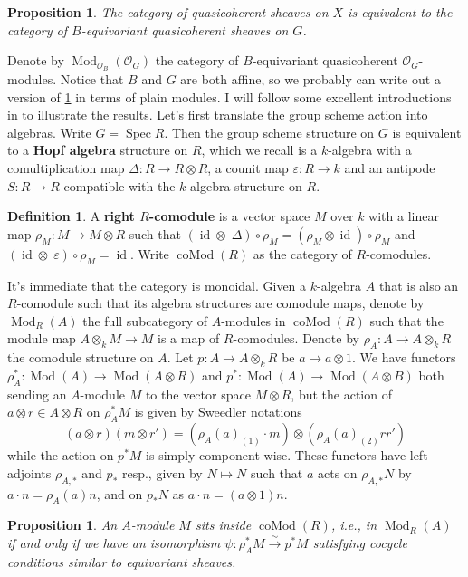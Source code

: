 \documentclass[11pt, a4paper]{article}
\newtheorem{proposition}[theorem]{Proposition}
\theoremstyle{definition}
\newtheorem{definition}[theorem]{Definition}
\newcommand{\ve}[0]{\varepsilon}
\newcommand{\D}[0]{\Delta}
\newcommand{\Spec}[0]{\operatorname{Spec}}
\newcommand{\id}[0]{\operatorname{id}}
\newcommand{\Mod}{\operatorname{Mod}}
\newcommand{\cMod}{\operatorname{coMod}}
\begin{document}
    \begin{proposition}\label{prop-B-equivariant}
        The category of quasicoherent sheaves on $X$ is equivalent to the category of $B$-equivariant quasicoherent sheaves on $G$.
    \end{proposition}
    Denote by $\Mod_{\mathcal O_B}(\mathcal O_G)$ the category of $B$-equivariant quasicoherent $\mathcal O_G$-modules. Notice that $B$ and $G$ are both affine, so we probably can write out a version of \cref{prop-B-equivariant} in terms of plain modules. I will follow some excellent introductions in \cite{ganev-notes-on-equivariant} to illustrate the results. Let's first translate the group scheme action into algebras. Write $G=\Spec R$. Then the group scheme structure on $G$ is equivalent to a \textbf{Hopf algebra} structure on $R$, which we recall is a $k$-algebra with a comultiplication map $\D:R\to R\otimes R$, a counit map $\ve:R\to k$ and an antipode $S:R\to R$ compatible with the $k$-algebra structure on $R$.
    \begin{definition}
        A \textbf{right $R$-comodule} is a vector space $M$ over $k$ with a linear map $\rho_M:M\to M\otimes R$ such that $(\id\otimes\;\D)\circ\rho_M=(\rho_M\otimes\id)\circ\rho_M$ and $(\id\otimes\;\ve)\circ\rho_M=\id$. Write $\cMod(R)$ as the category of $R$-comodules.
    \end{definition}
    It's immediate that the category is monoidal. Given a $k$-algebra $A$ that is also an $R$-comodule such that its algebra structures are comodule maps, denote by $\Mod_R(A)$ the full subcategory of $A$-modules in $\cMod(R)$ such that the module map $A\otimes_k M\to M$ is a map of $R$-comodules. Denote by $\rho_A:A\to A\otimes_k R$ the comodule structure on $A$. Let $p:A\to A\otimes_k R$ be $a\mapsto a\otimes 1$. We have functors $\rho_A^*:\Mod(A)\to \Mod(A\otimes R)$ and $p^*:\Mod(A)\to\Mod(A\otimes B)$ both sending an $A$-module $M$ to the vector space $M\otimes R$, but the action of $a\otimes r\in A\otimes R$ on $\rho_A^*M$ is given by Sweedler notations
    \[(a\otimes r)(m\otimes r')=(\rho_A(a)_{(1)}\cdot m)\otimes(\rho_A(a)_{(2)}rr')\]
    while the action on $p^*M$ is simply component-wise. These functors have left adjoints $\rho_{A,*}$ and $p_*$ resp., given by $N\mapsto N$ such that $a$ acts on $\rho_{A,*}N$ by $a\cdot n=\rho_A(a)n$, and on $p_*N$ as $a\cdot n=(a\otimes 1)n$.
    \begin{proposition}
        An $A$-module $M$ sits inside $\cMod(R)$, i.e., in $\Mod_R(A)$ if and only if we have an isomorphism $\psi:\rho_A^*M\xrightarrow{\sim}p^*M$ satisfying cocycle conditions similar to equivariant sheaves.
    \end{proposition}
\end{document}
